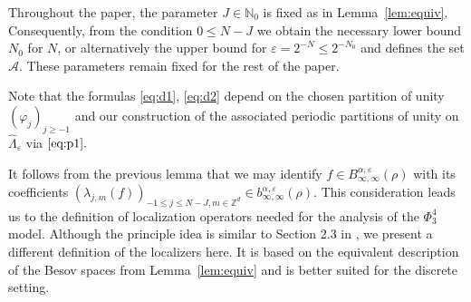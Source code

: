 \documentclass[a4paper,11pt]{article}
\numberwithin{equation}{section}
\begin{document}
\begin{remark}
  Throughout the paper, the parameter $J \in \mathbb{N}_0$ is fixed as in Lemma~\ref{lem:equiv}. Consequently, from the condition $0 \leqslant N - J$ we
  obtain the necessary lower bound $N_0$ for $N$, or alternatively the upper
  bound for $\varepsilon = 2^{- N} \leqslant 2^{- N_0}$ and defines the set
  $\mathcal{A}$. These parameters remain fixed for the rest of the paper.
\end{remark}

\begin{remark}
  \label{rem:3}Note that the formulas {\eqref{eq:d1}}, {\eqref{eq:d2}} depend
  on the chosen partition of unity $(\varphi_j)_{j \geqslant - 1}$ and our
  construction of the associated periodic partitions of unity on
  $\hat{\Lambda}_{\varepsilon}$ via $\eqref{eq:p1} .$
\end{remark}

It follows from the previous lemma that we may identify $f \in B^{\alpha,
\varepsilon}_{\infty, \infty} (\rho)$ with its coefficients $(\lambda_{j, m}
(f))_{- 1 \leqslant j \leqslant N - J, m \in \mathbb{Z}^d} \in b^{\alpha,
\varepsilon}_{\infty, \infty} (\rho)$. This consideration leads us to the
definition of localization operators needed for the analysis of the $\Phi^4_3$
model. Although the principle idea is similar to Section 2.3 in {\cite{GH18}},
we present a different definition of the localizers here. It is based on the
equivalent description of the Besov spaces from Lemma~\ref{lem:equiv} and is
better suited for the discrete setting.
\end{document}
